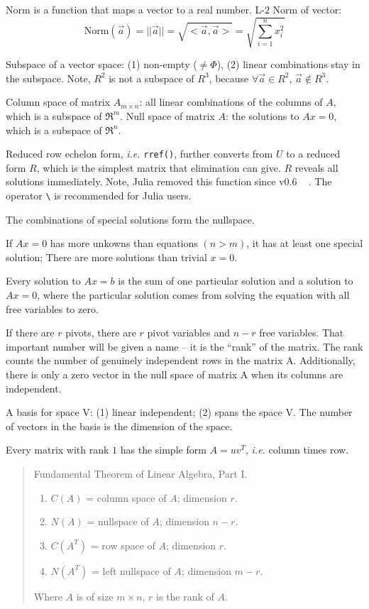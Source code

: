 Norm is a function that maps a vector to a real number. L-$2$ Norm of vector:
$$ \text{Norm}(\vec{a}) = ||\vec{a}|| = \sqrt{<\vec{a},\vec{a}>} = \sqrt{\sum_{i=1}^n x_i^2 } $$

Subspace of a vector space: (1) non-empty ($\neq \Phi$), (2) linear
combinations stay in the subspace. Note, $R^2$ is not a subspace of $R^3$,
because $\forall \vec{a} \in R^2$, $\vec{a} \notin R^3$.

Column space of matrix $A_{m\times n}$: all linear combinations of the columns of $A$,
which is a subspace of $\Re^m$. Null space of matrix $A$: the solutions to
$Ax=0$, which is a subspace of $\Re^n$.

Reduced row echelon form, {\it i.e.} \verb|rref()|, further converts from $U$
to a reduced form $R$, which is the simplest matrix that elimination can give.
$R$ reveals all solutions immediately. Note, Julia removed this function since
v0.6 ~ . The operator \verb|\| is recommended for Julia users.

The combinations of special solutions form the nullspace.

If $Ax=0$ has more unkowns than equations $(n>m)$, it has at least one special
solution; There are more solutions than trivial $x=0$.

Every solution to $Ax=b$ is the sum of one particular solution and a solution
to $Ax=0$, where the particular solution comes from solving the equation
with all free variables to zero.

If there are $r$ pivots, there are $r$ pivot variables and $n-r$ free variables.
That important number will be given a name -- it is the ``rank'' of the matrix.
The rank counts the number of genuinely independent rows in the matrix A.
Additionally, there is only a zero vector in the null space of matrix A when
its columns are independent.

A basis for space V: (1) linear independent; (2) spans the space V. The number
of vectors in the basis is the dimension of the space.

Every matrix with rank $1$ has the simple form $A=uv^T$, {\it i.e.} column
times row.

\begin{quote}

Fundamental Theorem of Linear Algebra, Part I.
\begin{enumerate}
\item $C (A)$ = column space of $A$; dimension $r$.
\item $N (A)$ = nullspace of $A$; dimension $n - r$.
\item $C (A^T)$ = row space of $A$; dimension $r$.
\item $N (A^T)$ = left nullspace of $A$; dimension $m - r$.
\end{enumerate}
Where $A$ is of size $m\times n$, $r$ is the rank of $A$.

\end{quote}

